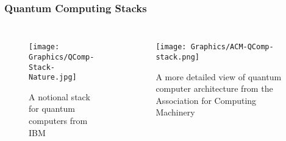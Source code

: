 
\begin{frame}
  \frametitle{Quantum Computing Stacks}

  \begin{columns}
    \begin{figure}
      \centering
      \texttt{[image: Graphics/QComp-Stack-Nature.jpg]}
      \caption{A notional stack for quantum computers from
        IBM~\cite{SC-QComp-stack}}   
    \end{figure}
    
    \begin{figure}
      \centering
      \texttt{[image: Graphics/ACM-QComp-stack.png]}
      \caption{A more detailed view of quantum computer architecture from
        the Association for Computing Machinery~\cite{acm-qcomp-blueprint}}
    \end{figure}
    
  \end{columns}
  
\end{frame}
